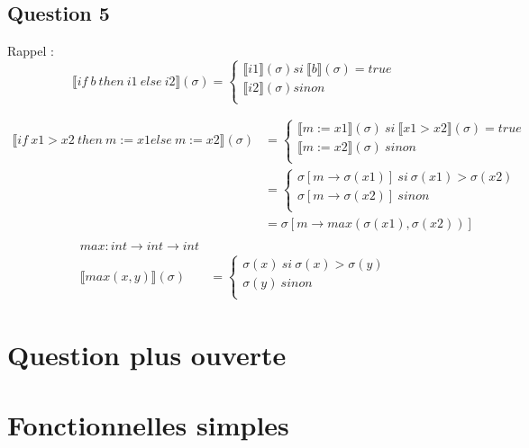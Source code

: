 \documentclass[11pt,a4paper]{article}
\begin{document}
	\subsection{Question 5}
	Rappel :\\
	\[
		 \llbracket if\ b\ then\ i1\ else\ i2 \rrbracket (\sigma) =
		\begin{cases}
			 \llbracket i1 \rrbracket (\sigma) si\  \llbracket b \rrbracket (\sigma) = true\\
			 \llbracket i2 \rrbracket (\sigma) sinon\\
		\end{cases}
	\]
	
	\begin{align*}
		 \llbracket if\ x1 > x2\ then\ m := x1 else\ m := x2 \rrbracket (\sigma) &=
		\begin{cases}
			 \llbracket m := x1 \rrbracket (\sigma)\ si\  \llbracket x1 > x2 \rrbracket (\sigma) = true\\
			 \llbracket m := x2 \rrbracket (\sigma)\ sinon\\
		\end{cases}\\
		&=
		\begin{cases}
			\sigma[m \to \sigma(x1)]\ si\ \sigma(x1) > \sigma(x2)\\
			\sigma[m \to \sigma(x2)]\ sinon\\
		\end{cases}\\
		&= \sigma[m \to max(\sigma(x1), \sigma(x2))]\\
	\end{align*}
	\begin{align*}
		max : int \to int \to int&\\
		 \llbracket max(x,y) \rrbracket (\sigma) &=
		\begin{cases}
			\sigma(x)\ si\ \sigma(x) > \sigma(y)\\
			\sigma(y)\ sinon\\
		\end{cases}
	\end{align*}
	
	\section{Question plus ouverte}
	
	\section{Fonctionnelles simples}
	
\end{document}
